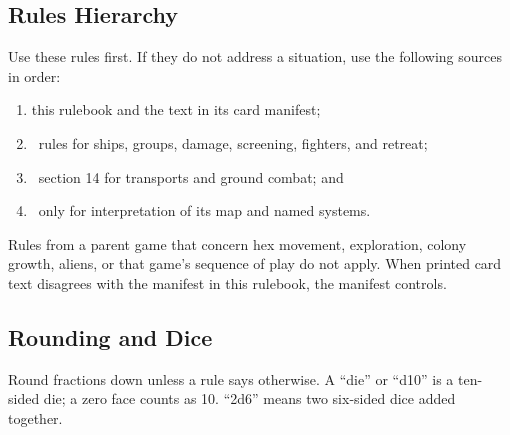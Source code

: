 \subsection{Rules Hierarchy}

Use these rules first. If they do not address a situation, use the following
sources in order:

\begin{enumerate}
  \item this rulebook and the text in its card manifest;
  \item \SpaceEmpires\ rules for ships, groups, damage, screening, fighters,
    and retreat;
  \item \CloseEncounters\ section 14 for transports and ground combat; and
  \item \Imperium\ only for interpretation of its map and named systems.
\end{enumerate}

Rules from a parent game that concern hex movement, exploration, colony
growth, aliens, or that game's sequence of play do not apply. When printed
card text disagrees with the manifest in this rulebook, the manifest controls.

\subsection{Rounding and Dice}

Round fractions down unless a rule says otherwise. A ``die'' or ``d10'' is a
ten-sided die; a zero face counts as 10. ``2d6'' means two six-sided dice
added together.
